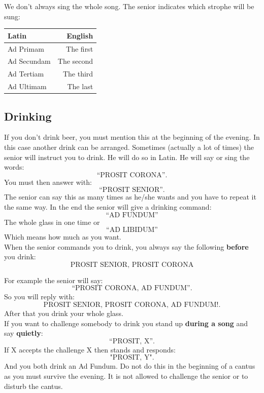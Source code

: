 \documentclass[a5paper]{article}
\begin{document}
We don't always sing the whole song. The senior indicates which strophe will be sung: 

\begin{table}[ht!]
\centering
\begin{tabular}{ l|r}
Latin & English \\
\hline
Ad Primam & The first \\
Ad Secundam & The second \\
Ad Tertiam & The third \\
Ad Ultimam & The last \\
\end{tabular}
\label{tab:stropheindicators}
\end{table}


\subsection{Drinking} %
\label{sub:drinking}

If you don't drink beer, you must mention this at the beginning of the evening. In this case another drink can be arranged.
Sometimes (actually a lot of times) the senior will instruct you to drink. He will do so in Latin. He will say or sing the words: $$\text{``PROSIT CORONA''.}$$ You must then answer with: $$\text{``PROSIT SENIOR''.}$$ The senior can say this as many times as he/she wants and you have to repeat it the same way. In the end the senior will give a drinking command:
$$\text{``AD FUNDUM''}$$ The whole glass in one time or $$\text{``AD LIBIDUM''}$$ Which means how much as you want.\\

When the senior commands you to drink, you always say the following \textbf{before} you drink: $$\text{PROSIT SENIOR, PROSIT CORONA}$$

For example the senior will say: $$\text{``PROSIT CORONA, AD FUNDUM''.}$$ So you will reply with: $$\text{PROSIT SENIOR, PROSIT CORONA, AD FUNDUM!.}$$ 
After that you drink your whole glass. \\

If you want to challenge somebody to drink you stand up \textbf{during a song} and say \textbf{quietly}: $$\text{``PROSIT, X''.}$$ If X accepts the challenge X then stands and responds: $$\text{"PROSIT, Y".}$$ And you both drink an Ad Fundum. Do not do this in the beginning of a cantus as you must survive the evening. It is not allowed to challenge the senior or to disturb the cantus.\\
\end{document}

